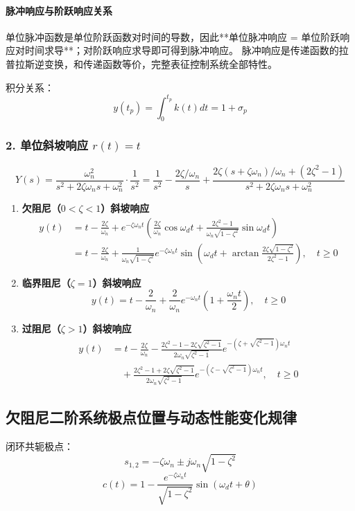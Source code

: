 \paragraph{脉冲响应与阶跃响应关系}
单位脉冲函数是单位阶跃函数对时间的导数，因此**单位脉冲响应 = 单位阶跃响应对时间求导**；对阶跃响应求导即可得到脉冲响应。
脉冲响应是传递函数的拉普拉斯逆变换，和传递函数等价，完整表征控制系统全部特性。

积分关系：
\[
y(t_p)=\int_0^{t_p} k(t)dt = 1+\sigma_p
\]

\subsubsection{2. 单位斜坡响应 $r(t)=t$}
\[
Y(s)=\frac{\omega_n^2}{s^2+2\zeta\omega_n s+\omega_n^2}\cdot \frac{1}{s^2}
=\frac{1}{s^2}-\frac{2\zeta/\omega_n}{s}+\frac{2\zeta(s+\zeta\omega_n)/\omega_n+(2\zeta^2-1)}{s^2+2\zeta\omega_n s+\omega_n^2}
\]

\begin{enumerate}
    \item \textbf{欠阻尼（$0<\zeta<1$）斜坡响应}
    \[
    \begin{aligned}
    y(t) &= t-\frac{2\zeta}{\omega_n}+e^{-\zeta\omega_n t}\left( \frac{2\zeta}{\omega_n}\cos\omega_d t+\frac{2\zeta^2-1}{\omega_n\sqrt{1-\zeta^2}}\sin\omega_d t \right) \\
    &= t-\frac{2\zeta}{\omega_n}+\frac{1}{\omega_n\sqrt{1-\zeta^2}}e^{-\zeta\omega_n t}\sin\left( \omega_d t+\arctan\frac{2\zeta\sqrt{1-\zeta^2}}{2\zeta^2-1} \right),\quad t\ge0
    \end{aligned}
    \]
    \item \textbf{临界阻尼（$\zeta=1$）斜坡响应}
    \[
    y(t)=t-\frac{2}{\omega_n}+\frac{2}{\omega_n}e^{-\omega_n t}\left(1+\frac{\omega_n t}{2}\right),\quad t\ge0
    \]
    \item \textbf{过阻尼（$\zeta>1$）斜坡响应}
    \[
    \begin{aligned}
    y(t) &= t-\frac{2\zeta}{\omega_n}-\frac{2\zeta^2-1-2\zeta\sqrt{\zeta^2-1}}{2\omega_n\sqrt{\zeta^2-1}}e^{-(\zeta+\sqrt{\zeta^2-1})\omega_n t} \\
    &\quad +\frac{2\zeta^2-1+2\zeta\sqrt{\zeta^2-1}}{2\omega_n\sqrt{\zeta^2-1}}e^{-(\zeta-\sqrt{\zeta^2-1})\omega_n t},\quad t\ge0
    \end{aligned}
    \]
\end{enumerate}

\subsection{欠阻尼二阶系统极点位置与动态性能变化规律}
闭环共轭极点：
\[
s_{1,2}=-\zeta\omega_n \pm j\omega_n\sqrt{1-\zeta^2}
\]
\[
c(t) = 1-\frac{e^{-\zeta\omega_n t}}{\sqrt{1-\zeta^2}}\sin(\omega_d t+\theta)
\]


